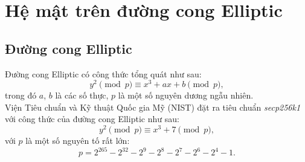 \section{Hệ mật trên đường cong Elliptic}

\subsection{Đường cong Elliptic}

Đường cong Elliptic có công thức tổng quát như sau:
$$
y^2\pmod{p}\equiv x^3+ax+b\pmod{p},
$$
trong đó $a$, $b$ là các số thực, $p$ là một số nguyên dương ngẫu nhiên.\\

Viện Tiêu chuẩn và Kỹ thuật Quốc gia Mỹ (NIST) đặt ra tiêu chuẩn \textit{secp256k1} với công thức của đường cong Elliptic như sau:
$$
y^2\pmod{p}\equiv x^3+7\pmod{p},
$$
với $p$ là một số nguyên tố rất lớn:
$$
p=2^{265}-2^{32}-2^9-2^8-2^7-2^6-2^4-1.
$$


